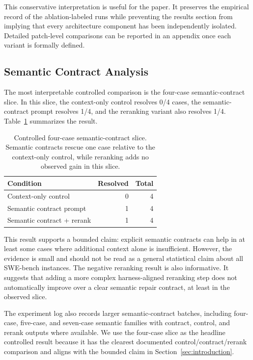 \documentclass[11pt]{article}
\begin{document}
This conservative interpretation is useful for the paper.  It preserves the empirical record of the ablation-labeled runs while preventing the results section from implying that every architecture component has been independently isolated.  Detailed patch-level comparisons can be reported in an appendix once each variant is formally defined.

\subsection{Semantic Contract Analysis}
\label{subsec:semantic-contract-results}

The most interpretable controlled comparison is the four-case semantic-contract slice.  In this slice, the context-only control resolves 0/4 cases, the semantic-contract prompt resolves 1/4, and the reranking variant also resolves 1/4.  Table~\ref{tab:semantic-contract} summarizes the result.

\begin{table}[t]
\centering
\small
\begin{tabular}{lrr}
\toprule
Condition & Resolved & Total \\
\midrule
Context-only control & 0 & 4 \\
Semantic contract prompt & 1 & 4 \\
Semantic contract + rerank & 1 & 4 \\
\bottomrule
\end{tabular}
\caption{Controlled four-case semantic-contract slice.  Semantic contracts rescue one case relative to the context-only control, while reranking adds no observed gain in this slice.}
\label{tab:semantic-contract}
\end{table}

This result supports a bounded claim: explicit semantic contracts can help in at least some cases where additional context alone is insufficient.  However, the evidence is small and should not be read as a general statistical claim about all SWE-bench instances.  The negative reranking result is also informative.  It suggests that adding a more complex harness-aligned reranking step does not automatically improve over a clear semantic repair contract, at least in the observed slice.

The experiment log also records larger semantic-contract batches, including four-case, five-case, and seven-case semantic families with contract, control, and rerank outputs where available.  We use the four-case slice as the headline controlled result because it has the clearest documented control/contract/rerank comparison and aligns with the bounded claim in Section~\ref{sec:introduction}.



\end{document}
